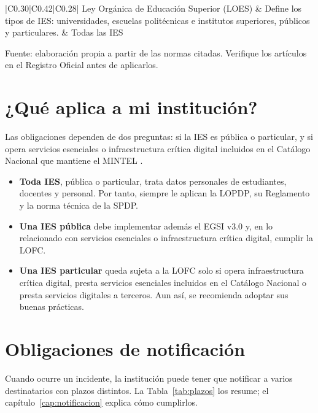 \documentclass[11pt,a4paper,oneside]{report}
\begin{document}
\begin{table}[htbp]
\begin{tabular}{|C{0.30}|C{0.42}|C{0.28}|}
    \hline
    Ley Orgánica de Educación Superior (LOES) \cite{loes2010} & Define los tipos de IES: universidades, escuelas politécnicas e institutos superiores, públicos y particulares. & Todas las IES \\
    \hline
  \end{tabular}
  \par\raggedright
  {\footnotesize Fuente: elaboración propia a partir de las normas citadas. Verifique los artículos en el Registro Oficial antes de aplicarlos.\par}
\end{table}

\section{¿Qué aplica a mi institución?}
Las obligaciones dependen de dos preguntas: si la IES es pública o particular, y si opera servicios esenciales o infraestructura crítica digital incluidos en el Catálogo Nacional que mantiene el MINTEL \cite{lofc2026}.

\begin{itemize}[leftmargin=*]
  \item \textbf{Toda IES}, pública o particular, trata datos personales de estudiantes, docentes y personal. Por tanto, siempre le aplican la LOPDP, su Reglamento y la norma técnica de la SPDP.
  \item \textbf{Una IES pública} debe implementar además el EGSI v3.0 \cite{egsi2024} y, en lo relacionado con servicios esenciales o infraestructura crítica digital, cumplir la LOFC.
  \item \textbf{Una IES particular} queda sujeta a la LOFC solo si opera infraestructura crítica digital, presta servicios esenciales incluidos en el Catálogo Nacional o presta servicios digitales a terceros. Aun así, se recomienda adoptar sus buenas prácticas.
\end{itemize}

\section{Obligaciones de notificación}
Cuando ocurre un incidente, la institución puede tener que notificar a varios destinatarios con plazos distintos. La Tabla~\ref{tab:plazos} los resume; el capítulo~\ref{cap:notificacion} explica cómo cumplirlos.
\end{document}
